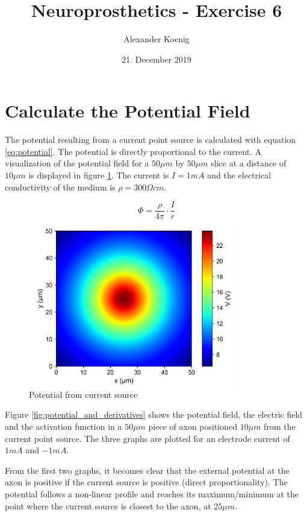 \documentclass{scrartcl}
\title{Neuroprosthetics - Exercise 6}
\author{Alexander Koenig}
\date{21. December 2019}
\begin{document}
\maketitle

\section{Calculate the Potential Field}

The potential resulting from a current point source is calculated with equation \ref{eq:potential}. The potential is directly proportional to the current. A visualization of the potential field for a $50 \mu m$ by $50 \mu m$ slice at a distance of $10 \mu m$ is displayed in figure \ref{fig:potential}. The current is $I=1mA$ and the electrical conductivity of the medium is $\rho = 300 \Omega cm$. 

\begin{equation} \label{eq:potential}
\Phi=\frac{\rho}{4 \pi} \cdot \frac{I}{r}
\end{equation}

\begin{figure}[h]
	\centering
	\includegraphics[width=0.8\textwidth]{figures/potential_processed}
	\caption{Potential from current source}
	\label{fig:potential}
\end{figure}

Figure \ref{fig:potential_and_derivatives} shows the potential field, the electric field and the activation function in a $50 \mu m$ piece of axon positioned $10 \mu m$ from the current point source. The three graphs are plotted for an electrode current of $1 mA$ and $-1mA$.

From the first two graphs, it becomes clear that the external potential at the axon is positive if the current source is positive (direct proportionality). The potential follows a non-linear profile and reaches its maximum/minimum at the point where the current source is closest to the axon, at $25 \mu m$.
\end{document}
